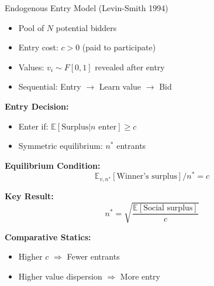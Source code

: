 \documentclass[xcolor={x11names}, aspectratio=169 ]{beamer}
\newcommand{\E}{\mathbb{E}}
\begin{document}
\begin{frame}{Endogenous Entry Model (Levin-Smith 1994)}
\begin{itemize}
  \item Pool of $N$ potential bidders
  \item Entry cost: $c > 0$ (paid to participate)
  \item Values: $v_i \sim F[0,1]$ revealed after entry
  \item Sequential: Entry $\rightarrow$ Learn value $\rightarrow$ Bid
\end{itemize}

\textbf{Entry Decision:}
\begin{itemize}
  \item Enter if: $\E[\text{Surplus} | n \text{ enter}] \geq c$
  \item Symmetric equilibrium: $n^*$ entrants
\end{itemize}

\textbf{Equilibrium Condition:}
$$\E_{v,n^*}[\text{Winner's surplus}] / n^* = c$$

\textbf{Key Result:}
$$n^* = \sqrt{\frac{\E[\text{Social surplus}]}{c}}$$

\textbf{Comparative Statics:}
\begin{itemize}
  \item Higher $c$ $\Rightarrow$ Fewer entrants
  \item Higher value dispersion $\Rightarrow$ More entry
\end{itemize}
\end{frame}
\end{document}
